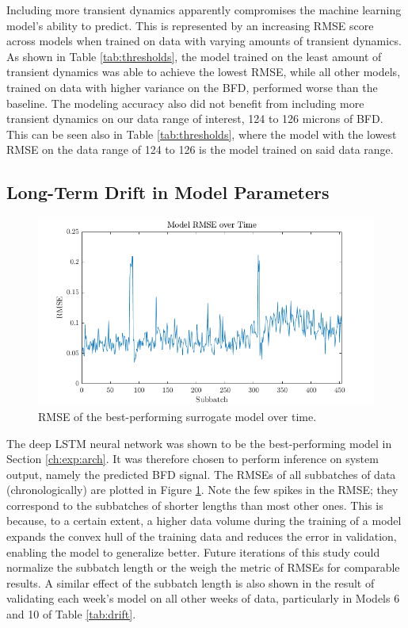 Including more transient dynamics apparently compromises the machine learning model's ability to predict. This is represented by an increasing RMSE score across models when trained on data with varying amounts of transient dynamics. As shown in Table \ref{tab:thresholds}, the model trained on the least amount of transient dynamics was able to achieve the lowest RMSE, while all other models, trained on data with higher variance on the BFD, performed worse than the baseline. The modeling accuracy also did not benefit from including more transient dynamics on our data range of interest, 124 to 126 microns of BFD. This can be seen also in Table \ref{tab:thresholds}, where the model with the lowest RMSE on the data range of 124 to 126 is the model trained on said data range. 

\subsection{Long-Term Drift in Model Parameters}

\begin{figure}[ht!]
    \centering
    \includegraphics[width=\textwidth]{figures/drift.png}
    \caption{RMSE of the best-performing surrogate model over time.}
    \label{fig:drift}
\end{figure}

The deep LSTM neural network was shown to be the best-performing model in Section \ref{ch:exp:arch}. It was therefore chosen to perform inference on system output, namely the predicted BFD signal. The RMSEs of all subbatches of data (chronologically) are plotted in Figure \ref{fig:drift}. Note the few spikes in the RMSE; they correspond to the subbatches of shorter lengths than most other ones. This is because, to a certain extent, a higher data volume during the training of a model expands the convex hull of the training data and reduces the error in validation, enabling the model to generalize better. Future iterations of this study could normalize the subbatch length or the weigh the metric of RMSEs for comparable results. A similar effect of the subbatch length is also shown in the result of validating each week's model on all other weeks of data, particularly in Models 6 and 10 of Table \ref{tab:drift}.

